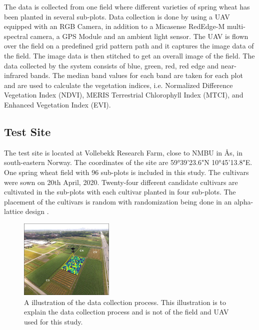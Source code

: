 \documentclass[sigconf, nonacm, natbib, screen, balance=False]{acmart}
\begin{document}
The data is collected from one field where different varieties of spring wheat has been planted in several sub-plots. Data collection is done by using a UAV equipped with an RGB Camera, in addition to a Micasense RedEdge-M multi-spectral camera, a GPS Module and an ambient light sensor. The UAV is flown over the field on a predefined grid pattern path and it captures the image data of the field. The image data is then stitched to get an overall image of the field. The data collected by the system consists of blue, green, red, red edge and near-infrared bands. The median band values for each band are taken for each plot and are used to calculate the vegetation indices, i.e. Normalized Difference Vegetation Index (NDVI), MERIS Terrestrial Chlorophyll Index (MTCI), and Enhanced Vegetation Index (EVI).

\subsection{Test Site}\label{sec:site}

The test site is located at Vollebekk Research Farm, close to NMBU in Ås, in south-eastern Norway. The coordinates of the site are 59°39'23.6"N 10°45'13.8"E. One spring wheat field with 96 sub-plots is included in this study. The cultivars were sown on 20th April, 2020. Twenty-four different candidate cultivars are cultivated in the sub-plots with each cultivar planted in four sub-plots. The placement of the cultivars is random with randomization being done in an alpha-lattice design \citep{Kumar2020}.


\begin{figure}[h]
  \centering
   \hspace*{-0.25in}
   \includegraphics[width=0.4\textwidth, angle=0,]{moghimi.jpg}
  \caption{A illustration of the data collection process\citep{moghimi}. This illustration is to explain the data collection process and is not of the field and UAV used for this study.}

  \label{fig:example}
\end{figure}
\end{document}
